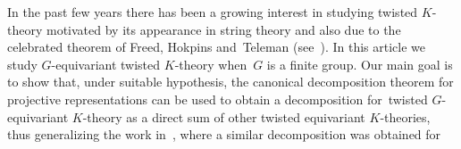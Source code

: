 In the past few years there has been a growing interest in studying
twisted $K$-theory motivated by its appearance in string theory and also due
to the celebrated theorem of Freed, Hokpins and~Teleman (see~\cite[Theorem~1]{FHT}).
In this article we study $G$-equivariant twisted $K$-theory when~$G$ is a finite group.
Our main goal is to show that, under suitable hypothesis, the canonical decomposition
theorem for projective representations can be used to obtain a decomposition for~twisted
$G$-equivariant $K$-theory as a direct sum of other twisted equivariant $K$-theories,
thus generalizing the work in~\cite{GomezUribe}, where a similar decomposition was obtained for
